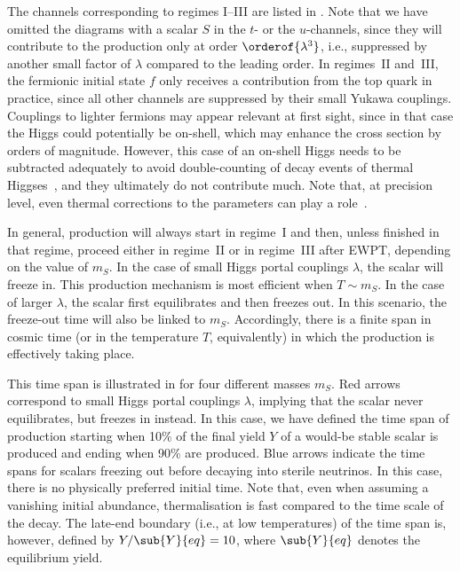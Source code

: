 The channels corresponding to regimes I--III are listed in . Note that we have omitted the diagrams with a scalar $S$ in the $t$- or the $u$-channels, since they will contribute to the production only at order $\orderof{\lambda^3}$, i.e., suppressed by another small factor of $\lambda$ compared to the leading order. In regimes~II and~III, the fermionic initial state $f$ only receives a contribution from the top quark in practice, since all other channels are suppressed by their small Yukawa couplings. Couplings to lighter fermions may appear relevant at first sight, since in that case the Higgs could potentially be on-shell, which may enhance the cross section by orders of magnitude. However, this case of an on-shell Higgs needs to be subtracted adequately to avoid double-counting of decay events of thermal Higgses~\cite{Frigerio:2011in}, and they ultimately do not contribute much. Note that, at precision level, even thermal corrections to the parameters can play a role~\cite{Drewes:2015eoa}.

In general, production will always start in regime~I and then, unless finished in that regime, proceed either in regime~II or in regime~III after EWPT, depending on the value of $m_S$. In the case of small Higgs portal couplings $\lambda$, the scalar will freeze in. This production mechanism is most efficient when $T \sim m_S$. In the case of larger $\lambda$, the scalar first equilibrates and then freezes out. In this scenario, the freeze-out time will also be linked to $m_S$. Accordingly, there is a finite span in cosmic time (or in the temperature $T$, equivalently) in which the production is effectively taking place. 

This time span is illustrated in  for four different masses $m_S$. Red arrows correspond to small Higgs portal couplings $\lambda$, implying that the scalar never equilibrates, but freezes in instead. In this case, we have defined the time span of production starting when 10\% of the final yield $Y$ of a would-be stable scalar is produced and ending when 90\% are produced. Blue arrows indicate the time spans for scalars freezing out before decaying into sterile neutrinos. In this case, there is no physically preferred initial time. Note that, even when assuming a vanishing initial abundance, thermalisation is fast compared to the time scale of the decay. The late-end boundary (i.e., at low temperatures) of the time span is, however, defined by $Y/\sub{Y}{eq}=10$, where $\sub{Y}{eq}$ denotes the equilibrium yield.

